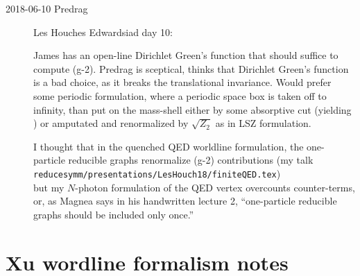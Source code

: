 \begin{description}
\item[2018-06-10 Predrag] Les Houches Edwardsiad day 10:

James has an open-line Dirichlet Green's function that should suffice
to compute (g-2). Predrag is sceptical, thinks that Dirichlet Green's function
is a bad choice, as it breaks the translational invariance. Would prefer
some periodic formulation, where a periodic space box is taken off to
infinity, than put on the mass-shell either by some absorptive cut
(yielding ) or amputated and renormalized by
$\sqrt{Z_2}$ as in LSZ formulation.

I thought that in the quenched QED worldline formulation, the
one-particle reducible graphs renormalize (g-2) contributions (my talk\\
\texttt{reducesymm/presentations/LesHouch18/finiteQED.tex}) \\
but my $N$-photon formulation of the QED vertex overcounts counter-terms,
or, as Magnea says in his handwritten
 {lecture 2},
``one-particle reducible graphs should be included only once.''


\end{description}


\section{Xu wordline formalism notes}
\label{c-dailyBlogGX}

